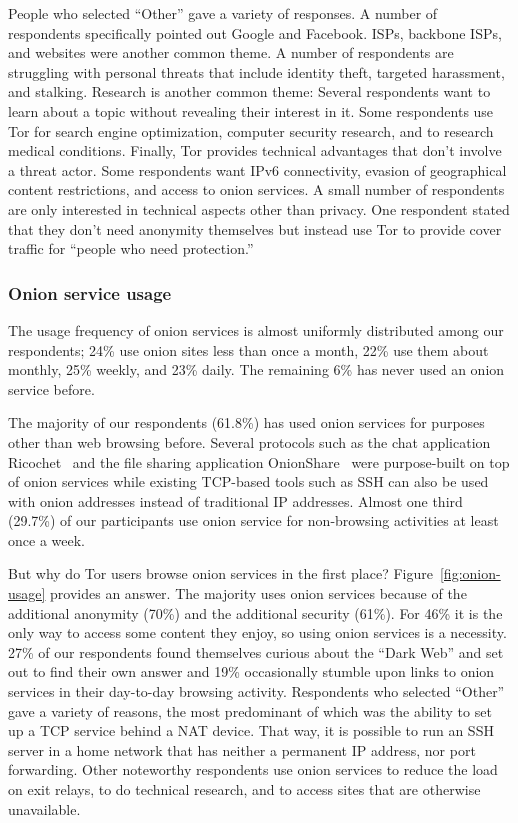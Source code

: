 People who selected ``Other'' gave a variety of responses.  A number of
respondents specifically pointed out Google and Facebook.  ISPs, backbone ISPs,
and websites were another common theme.  A number of respondents are struggling
with personal threats that include identity theft, targeted harassment, and
stalking.  Research is another common theme: Several respondents want to learn
about a topic without revealing their interest in it.  Some respondents use Tor
for search engine optimization, computer security research, and to research
medical conditions.  Finally, Tor provides technical advantages that don't
involve a threat actor.  Some respondents want IPv6 connectivity, evasion of
geographical content restrictions, and access to onion services.  A small number
of respondents are only interested in technical aspects other than privacy.  One
respondent stated that they don't need anonymity themselves but instead use Tor
to provide cover traffic for ``people who need protection.''

\subsubsection{Onion service usage}

The usage frequency of onion services is almost uniformly distributed among our
respondents; 24\% use onion sites less than once a month, 22\% use them about
monthly, 25\% weekly, and 23\% daily.  The remaining 6\% has never used an onion
service before.

The majority of our respondents (61.8\%) has used onion services for purposes
other than web browsing before.  Several protocols such as the chat application
Ricochet~\cite{ricochet} and the file sharing application
OnionShare~\cite{onionshare} were purpose-built on top of onion services while
existing TCP-based tools such as SSH can also be used with onion addresses
instead of traditional IP addresses.  Almost one third (29.7\%) of our
participants use onion service for non-browsing activities at least once a week.

But why do Tor users browse onion services in the first place?
Figure~\ref{fig:onion-usage} provides an answer.  The majority uses onion
services because of the additional anonymity (70\%) and the additional security
(61\%).  For 46\% it is the only way to access some content they enjoy, so using
onion services is a necessity.  27\% of our respondents found themselves curious
about the ``Dark Web'' and set out to find their own answer and 19\%
occasionally stumble upon links to onion services in their day-to-day browsing
activity.  Respondents who selected ``Other'' gave a variety of reasons, the
most predominant of which was the ability to set up a TCP service behind a NAT
device.  That way, it is possible to run an SSH server in a home network that
has neither a permanent IP address, nor port forwarding.  Other noteworthy
respondents use onion services to reduce the load on exit relays, to do
technical research, and to access sites that are otherwise unavailable.

